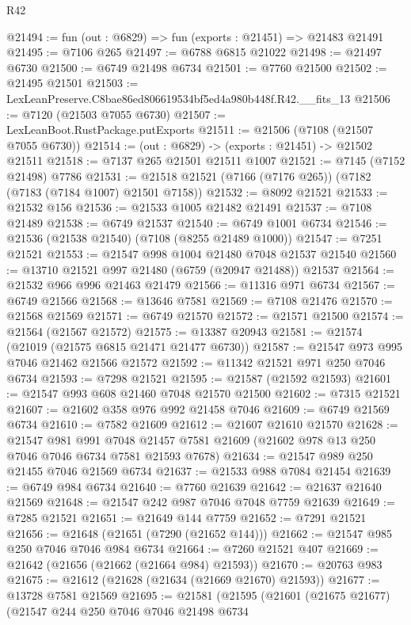 \begin{lexlean}{R42}
\begin{coremodule}
{@21494 := fun (out : @6829) => fun (exports : @21451) => @21483 @21491
@21495 := @7106 @265
@21497 := @6788 @6815 @21022
@21498 := @21497 @6730
@21500 := @6749 @21498 @6734
@21501 := @7760 @21500
@21502 := @21495 @21501
@21503 := LexLeanPreserve.C8bae86ed806619534bf5ed4a980b448f.R42.__fits_13
@21506 := @7120 (@21503 @7055 @6730)
@21507 := LexLeanBoot.RustPackage.putExports
@21511 := @21506 (@7108 (@21507 @7055 @6730))
@21514 := (out : @6829) -> (exports : @21451) -> @21502 @21511
@21518 := @7137 @265 @21501 @21511 @1007
@21521 := @7145 (@7152 @21498) @7786
@21531 := @21518 @21521 (@7166 (@7176 @265)) (@7182 (@7183 (@7184 @1007) @21501 @7158))
@21532 := @8092 @21521
@21533 := @21532 @156
@21536 := @21533 @1005 @21482 @21491
@21537 := @7108 @21489
@21538 := @6749 @21537
@21540 := @6749 @1001 @6734
@21546 := @21536 (@21538 @21540) (@7108 (@8255 @21489 @1000))
@21547 := @7251 @21521
@21553 := @21547 @998 @1004 @21480 @7048 @21537 @21540
@21560 := @13710 @21521 @997 @21480 (@6759 (@20947 @21488)) @21537
@21564 := @21532 @966 @996 @21463 @21479
@21566 := @11316 @971 @6734
@21567 := @6749 @21566
@21568 := @13646 @7581
@21569 := @7108 @21476
@21570 := @21568 @21569
@21571 := @6749 @21570
@21572 := @21571 @21500
@21574 := @21564 (@21567 @21572)
@21575 := @13387 @20943
@21581 := @21574 (@21019 (@21575 @6815 @21471 @21477 @6730))
@21587 := @21547 @973 @995 @7046 @21462 @21566 @21572
@21592 := @11342 @21521 @971 @250 @7046 @6734
@21593 := @7298 @21521
@21595 := @21587 (@21592 @21593)
@21601 := @21547 @993 @608 @21460 @7048 @21570 @21500
@21602 := @7315 @21521
@21607 := @21602 @358 @976 @992 @21458 @7046
@21609 := @6749 @21569 @6734
@21610 := @7582 @21609
@21612 := @21607 @21610 @21570
@21628 := @21547
    @981
    @991
    @7048
    @21457
    @7581
    @21609
    (@21602 @978 @13 @250 @7046 @7046 @6734 @7581 @21593 @7678)
@21634 := @21547 @989 @250 @21455 @7046 @21569 @6734
@21637 := @21533 @988 @7084 @21454
@21639 := @6749 @984 @6734
@21640 := @7760 @21639
@21642 := @21637 @21640 @21569
@21648 := @21547 @242 @987 @7046 @7048 @7759 @21639
@21649 := @7285 @21521
@21651 := @21649 @144 @7759
@21652 := @7291 @21521
@21656 := @21648 (@21651 (@7290 (@21652 @144)))
@21662 := @21547 @985 @250 @7046 @7046 @984 @6734
@21664 := @7260 @21521 @407
@21669 := @21642 (@21656 (@21662 (@21664 @984) @21593))
@21670 := @20763 @983
@21675 := @21612 (@21628 (@21634 (@21669 @21670) @21593))
@21677 := @13728 @7581 @21569
@21695 := @21581
    (@21595
      (@21601
        (@21675 @21677)
        (@21547
          @244
          @250
          @7046
          @7046
          @21498
          @6734
}
\end{coremodule}
\end{lexlean}
